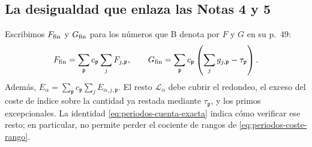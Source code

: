\subsection{La desigualdad que enlaza las Notas 4 y 5}

Escribimos $F_{\rm fin}$ y $G_{\rm fin}$ para los números que B
denota por $F$ y $G$ en su p.~49:
\[
 F_{\rm fin}=\sum_\mathfrak p c_\mathfrak p\sum_jF_{j,\mathfrak p},
 \qquad
 G_{\rm fin}=\sum_\mathfrak p c_\mathfrak p
                    \left(\sum_jg_{j,\mathfrak p}-\tau_\mathfrak p\right).
\]
Además, $E_\alpha=\sum_\mathfrak p c_\mathfrak p
\sum_jE_{\alpha,j,\mathfrak p}$.
El resto $\mathcal L_\alpha$ debe cubrir el redondeo, el exceso
del coste de índice sobre la cantidad ya restada mediante
$\tau_\mathfrak p$, y los primos excepcionales. La identidad
\eqref{eq:periodos-cuenta-exacta} indica cómo verificar ese resto;
en particular, no permite perder el cociente de rangos de
\eqref{eq:periodos-coste-rango}.

